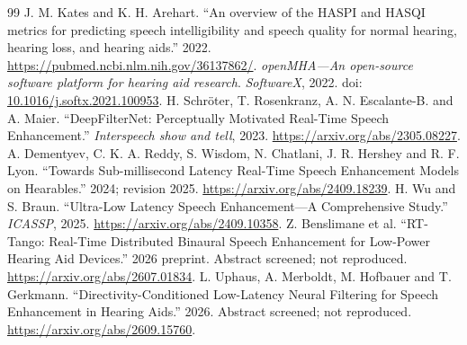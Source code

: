 \documentclass[11pt,a4paper]{article}
\begin{document}
\begin{thebibliography}{99}
 J. M. Kates and K. H. Arehart. ``An overview of the HASPI and HASQI metrics for predicting speech intelligibility and speech quality for normal hearing, hearing loss, and hearing aids.'' 2022. \url{https://pubmed.ncbi.nlm.nih.gov/36137862/}.
 \emph{openMHA---An open-source software platform for hearing aid research}. \emph{SoftwareX}, 2022. doi: \href{https://doi.org/10.1016/j.softx.2021.100953}{10.1016/j.softx.2021.100953}.
 H. Schr\"oter, T. Rosenkranz, A. N. Escalante-B. and A. Maier. ``DeepFilterNet: Perceptually Motivated Real-Time Speech Enhancement.'' \emph{Interspeech show and tell}, 2023. \url{https://arxiv.org/abs/2305.08227}.
 A. Dementyev, C. K. A. Reddy, S. Wisdom, N. Chatlani, J. R. Hershey and R. F. Lyon. ``Towards Sub-millisecond Latency Real-Time Speech Enhancement Models on Hearables.'' 2024; revision 2025. \url{https://arxiv.org/abs/2409.18239}.
 H. Wu and S. Braun. ``Ultra-Low Latency Speech Enhancement---A Comprehensive Study.'' \emph{ICASSP}, 2025. \url{https://arxiv.org/abs/2409.10358}.
 Z. Benslimane et al. ``RT-Tango: Real-Time Distributed Binaural Speech Enhancement for Low-Power Hearing Aid Devices.'' 2026 preprint. Abstract screened; not reproduced. \url{https://arxiv.org/abs/2607.01834}.
 L. Uphaus, A. Merboldt, M. Hofbauer and T. Gerkmann. ``Directivity-Conditioned Low-Latency Neural Filtering for Speech Enhancement in Hearing Aids.'' 2026. Abstract screened; not reproduced. \url{https://arxiv.org/abs/2609.15760}.
\end{thebibliography}
\end{document}

